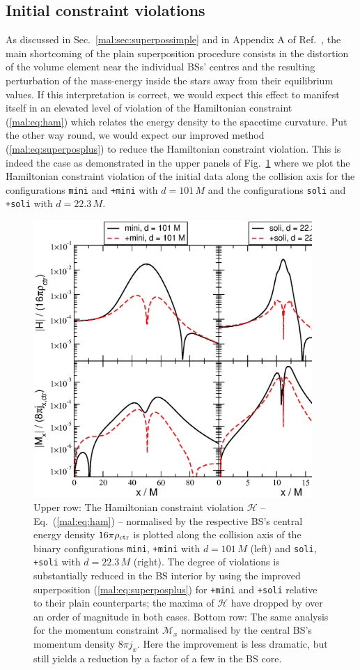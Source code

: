 \subsection{Initial constraint violations}
%
As discussed in Sec.~\ref{mal:sec:superpossimple} and in Appendix
A of Ref.~\cite{Helfer:2018vtq},
the main shortcoming of the plain superposition procedure
consists in the distortion of the volume element near the
individual BSs' centres and the resulting perturbation
of the mass-energy inside the stars away from their equilibrium
values. If this interpretation is correct, we would expect
this effect to manifest itself in an elevated level of violation
of the Hamiltonian constraint
(\ref{mal:eq:ham}) which relates the energy density to the
spacetime curvature. Put the other way round, we would
expect our improved method (\ref{mal:eq:superposplus}) to reduce the
Hamiltonian constraint violation. This is indeed the case
as demonstrated in the upper panels of
Fig.~\ref{mal:fig:ham} where we plot the
Hamiltonian constraint violation of the initial data
along the collision axis for the configurations
{\tt mini} and {\tt +mini} with $d=101\,M$ and 
the configurations {\tt soli} and {\tt +soli} with
$d=22.3\,M$.
%
\begin{figure}
  \centering
  \includegraphics[width=300pt]{malaise_source/constraints.eps}
  \caption{Upper row: The Hamiltonian constraint violation $\mathcal{H}$ --
  Eq.~(\ref{mal:eq:ham}) -- normalised by the respective BS's
  central energy density $16\pi \rho_{\rm ctr}$
  is plotted along the collision
  axis of the binary configurations {\tt mini}, {\tt +mini}
  with $d=101\,M$ (left) and {\tt soli}, {\tt +soli} with $d=22.3\,M$ (right).
  The degree of violations is substantially reduced in the
  BS interior by using
  the improved superposition (\ref{mal:eq:superposplus})
  for {\tt +mini} and {\tt +soli} relative to their plain
  counterparts; the maxima of $\mathcal{H}$ have dropped by
  over an order of magnitude in both cases.
  Bottom row: The same analysis for the momentum constraint
  $\mathcal{M}_x$
  normalised by the central BS's momentum density
  $8\pi j_x$. Here the improvement is less dramatic,
  but still yields a reduction by a factor of a few
  in the BS core.
  }
  \label{mal:fig:ham}
\end{figure}
%

